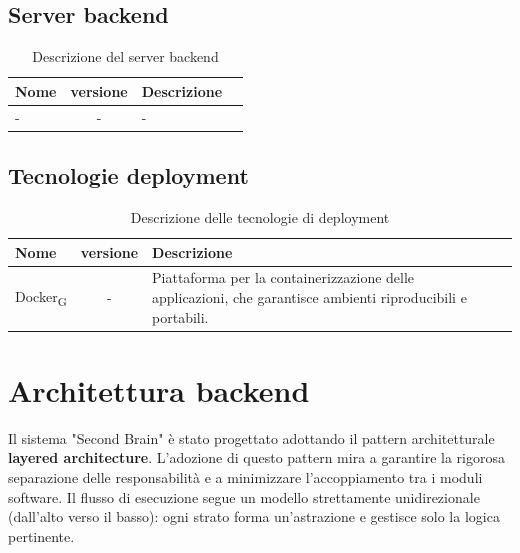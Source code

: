 \documentclass[11pt,a4paper]{article}
\newcommand{\gls}[1]{#1\textsubscript{G}}
\begin{document}
\subsection{Server backend}
    \begin{table}[H]
        \centering
        \begin{tabular}{|l|c|>{\raggedright\arraybackslash}p{}|p{}|}
            \hline
            \textbf{Nome} & \textbf{versione} & \textbf{Descrizione} \\
            \hline
            - & - & - \\
            \hline
        \end{tabular}
        \caption{Descrizione del server backend}
        \label{tab:server_backend}
    \end{table}
\subsection{Tecnologie deployment}
    \begin{table}[H]
        \centering
        \begin{tabular}{|l|c|>{\raggedright\arraybackslash}p{}|p{}|}
            \hline
            \textbf{Nome} & \textbf{versione} & \textbf{Descrizione} \\
            \hline
            \gls{Docker} & - & Piattaforma per la containerizzazione delle applicazioni, che garantisce ambienti riproducibili e portabili. \\
            \hline
        \end{tabular}
        \caption{Descrizione delle tecnologie di deployment}
        \label{tab:tecnologie_deployment}
    \end{table}

\section{Architettura backend}
Il sistema "Second Brain" è stato progettato adottando il pattern architetturale \textbf{layered architecture}. L'adozione di questo pattern mira a garantire la rigorosa separazione delle responsabilità e a minimizzare l'accoppiamento tra i moduli software. Il flusso di esecuzione segue un modello strettamente unidirezionale (dall'alto verso il basso): ogni strato forma un'astrazione e gestisce solo la logica pertinente.
\end{document}

